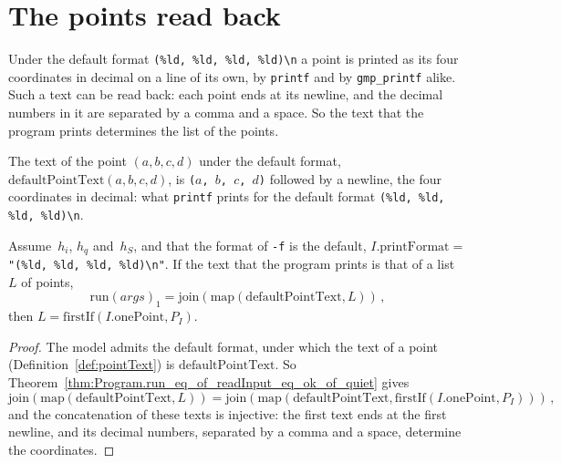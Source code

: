 \section{The points read back}\label{sec:theoremsReadBack}

Under the default format \verb|(%ld, %ld, %ld, %ld)\n| a point is printed as its four coordinates
in decimal on a line of its own, by \texttt{printf} and by \texttt{gmp\_printf} alike. Such a text
can be read back: each point ends at its newline, and the decimal numbers in it are separated by
a comma and a space. So the text that the program prints determines the list of the
points.

\begin{definition}\label{def:defaultPointText}
  \leanok
  The text of the point $(a, b, c, d)$ under the default format,
  $\mathrm{defaultPointText}(a, b, c, d)$, is
  \texttt{(}$a$\texttt{, }$b$\texttt{, }$c$\texttt{, }$d$\texttt{)} followed by a newline, the four
  coordinates in decimal: what \texttt{printf} prints for the default format
  \verb|(%ld, %ld, %ld, %ld)\n|.
\end{definition}

\begin{theorem}\label{thm:Program.eq_firstIf_orderedPoints_of_run_eq}
  \leanok
  Assume~$h_i$, $h_q$ and~$h_S$, and that the format of \texttt{-f} is the default,
  $I.\mathrm{printFormat} = $ \verb|"(%ld, %ld, %ld, %ld)\n"|. If the text that the program prints is
  that of a list~$L$ of points,
  \[ \mathrm{run}(\mathit{args})_1 = \mathrm{join}(\mathrm{map}(\mathrm{defaultPointText}, L))\,, \]
  then $L = \mathrm{firstIf}(I.\mathrm{onePoint}, P_I)$.
\end{theorem}

\begin{proof}
  \leanok
  The model admits the default format, under which the text of a point
  (Definition~\ref{def:pointText}) is $\mathrm{defaultPointText}$. So
  Theorem~\ref{thm:Program.run_eq_of_readInput_eq_ok_of_quiet} gives
  \[ \mathrm{join}(\mathrm{map}(\mathrm{defaultPointText}, L)) =
     \mathrm{join}(\mathrm{map}(\mathrm{defaultPointText},
     \mathrm{firstIf}(I.\mathrm{onePoint}, P_I)))\,, \]
  and the concatenation of these texts is injective: the first text ends at the first newline, and
  its decimal numbers, separated by a comma and a space, determine the coordinates.
\end{proof}

